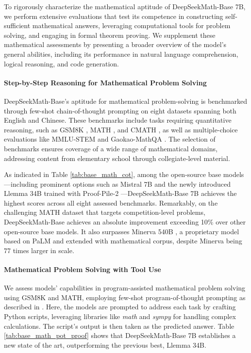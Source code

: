 To rigorously characterize the mathematical aptitude of DeepSeekMath-Base 7B, we perform extensive evaluations that test its competence in constructing self-sufficient mathematical answers, leveraging computational tools for problem solving, and engaging in formal theorem proving. We supplement these mathematical assessments by presenting a broader overview of the model’s general abilities, including its performance in natural language comprehension, logical reasoning, and code generation.

\paragraph{Step-by-Step Reasoning for Mathematical Problem Solving}

DeepSeekMath-Base’s aptitude for mathematical problem-solving is benchmarked through few-shot chain-of-thought prompting \citep{cot} on eight datasets spanning both English and Chinese. These benchmarks include tasks requiring quantitative reasoning, such as GSM8K \citep{gsm8k}, MATH \citep{MATH}, and CMATH \citep{wei2023cmath}, as well as multiple-choice evaluations like MMLU-STEM \citep{mmlu} and Gaokao-MathQA \citep{agieval}. The selection of benchmarks ensures coverage of a wide range of mathematical domains, addressing content from elementary school through collegiate-level material.

As indicated in Table \ref{tab:base_math_cot}, among the open-source base models—including prominent options such as Mistral 7B \citep{mistral} and the newly introduced Llemma 34B \citep{llemma} trained with Proof-Pile-2 \citep{llemma}—DeepSeekMath-Base 7B achieves the highest scores across all eight assessed benchmarks. Remarkably, on the challenging MATH dataset that targets competition-level problems, DeepSeekMath-Base achieves an absolute improvement exceeding 10\% over other open-source base models. It also surpasses Minerva 540B \citep{minerva}, a proprietary model based on PaLM \citep{palm} and extended with mathematical corpus, despite Minerva being 77 times larger in scale.

\paragraph{Mathematical Problem Solving with Tool Use} 
We assess models' capabilities in program-assisted mathematical problem solving using GSM8K and MATH, employing few-shot program-of-thought prompting as described in \citep{pot,pal}. Here, the models are prompted to address each task by crafting Python scripts, leveraging libraries like \textit{math} and \textit{sympy} for handling complex calculations. The script’s output is then taken as the predicted answer. Table \ref{tab:base_math_pot_proof} shows that DeepSeekMath-Base 7B establishes a new state of the art, outperforming the previous best, Llemma 34B.

